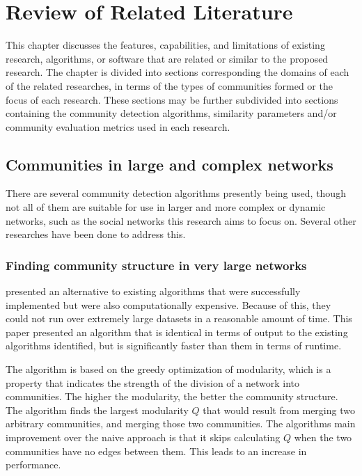 %
%
%                 


\chapter{Review of Related Literature}
\label{sec:relatedlit}


This chapter discusses the features, capabilities, and limitations of existing research, algorithms, or software that are related or similar to the proposed research. The chapter is divided into sections corresponding the domains of each of the related researches, in terms of the types of communities formed or the focus of each research. These sections may be further subdivided into sections containing the community detection algorithms, similarity parameters and/or community evaluation metrics used in each research.


\section{Communities in large and complex networks}


There are several community detection algorithms presently being used, though not all of them are suitable for use in larger and more complex or dynamic networks, such as the social networks this research aims to focus on. Several other researches have been done to address this.


\subsection{Finding community structure in very large networks}


 presented an alternative to existing algorithms that were successfully implemented but were also computationally expensive. Because of this, they could not run over extremely large datasets in a reasonable amount of time. This paper presented an algorithm that is identical in terms of output to the existing algorithms identified, but is significantly faster than them in terms of runtime.


The algorithm is based on the greedy optimization of modularity, which is a property that indicates the strength of the division of a network into communities. The higher the modularity, the better the community structure. 
The algorithm finds the largest modularity $Q$ that would result from merging two arbitrary communities, and merging those two communities. The algorithm\vtick s main improvement over the naive approach is that it skips calculating $Q$ when the two communities have no edges between them. This leads to an increase in performance. 



